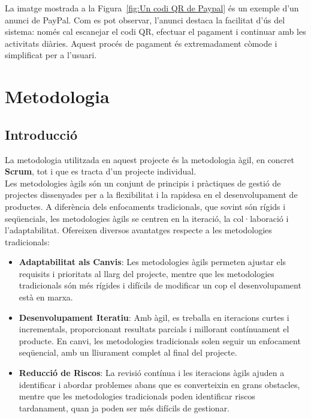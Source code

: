 \documentclass[a4paper,12pt,twoside]{ThesisStyle}
\begin{document}
  La imatge mostrada a la Figura~\ref{fig:Un codi QR de Paypal} és un exemple d'un anunci de PayPal. Com es pot observar, l'anunci destaca la facilitat d'ús del sistema: només cal escanejar el codi QR, efectuar el pagament i continuar amb les activitats diàries. Aquest procés de pagament és extremadament còmode i simplificat per a l'usuari.

\chapter{Metodologia}
\label{chp:metodologia}


\section{Introducció}
\label{subsec: Introducció}

La metodologia utilitzada en aquest projecte és la metodologia àgil, en concret \textbf{Scrum}, tot i que es tracta d'un projecte individual.\\

Les metodologies àgils són un conjunt de principis i pràctiques de gestió de projectes dissenyades per a la flexibilitat i la rapidesa en el desenvolupament de productes. A diferència dels enfocaments tradicionals, que sovint són rígids i seqüencials, les metodologies àgils se centren en la iteració, la col·laboració i l'adaptabilitat. Ofereixen diversos avantatges respecte a les metodologies tradicionals:
\begin{itemize}
    \item \textbf{Adaptabilitat als Canvis}: Les metodologies àgils permeten ajustar els requisits i prioritats al llarg del projecte, mentre que les metodologies tradicionals són més rígides i difícils de modificar un cop el desenvolupament està en marxa.
    \item \textbf{Desenvolupament Iteratiu}: Amb àgil, es treballa en iteracions curtes i incrementals, proporcionant resultats parcials i millorant contínuament el producte. En canvi, les metodologies tradicionals solen seguir un enfocament seqüencial, amb un lliurament complet al final del projecte.
    \item \textbf{Reducció de Riscos}: La revisió contínua i les iteracions àgils ajuden a identificar i abordar problemes abans que es converteixin en grans obstacles, mentre que les metodologies tradicionals poden identificar riscos tardanament, quan ja poden ser més difícils de gestionar.
\end{itemize}
\end{document}
